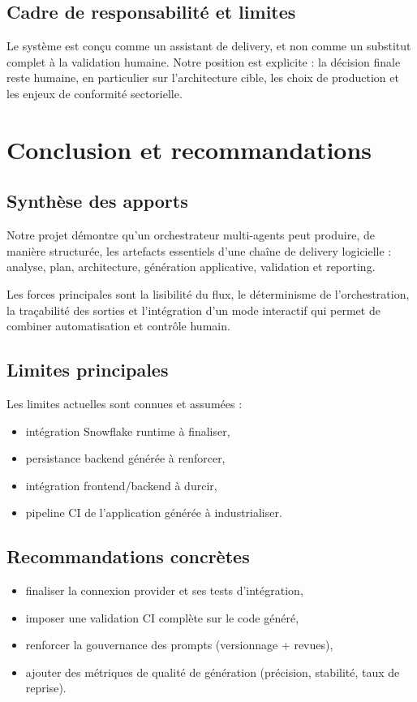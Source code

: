 \documentclass[11pt,a4paper]{article}
\begin{document}
\subsection*{Cadre de responsabilité et limites}
Le système est conçu comme un assistant de delivery, et non comme un substitut complet à la validation humaine. Notre position est explicite : la décision finale reste humaine, en particulier sur l'architecture cible, les choix de production et les enjeux de conformité sectorielle.

\section{Conclusion et recommandations}
\subsection*{Synthèse des apports}
Notre projet démontre qu'un orchestrateur multi-agents peut produire, de manière structurée, les artefacts essentiels d'une chaîne de delivery logicielle : analyse, plan, architecture, génération applicative, validation et reporting.

Les forces principales sont la lisibilité du flux, le déterminisme de l'orchestration, la traçabilité des sorties et l'intégration d'un mode interactif qui permet de combiner automatisation et contrôle humain.

\subsection*{Limites principales}
Les limites actuelles sont connues et assumées :
\begin{itemize}
  \item intégration Snowflake runtime à finaliser,
  \item persistance backend générée à renforcer,
  \item intégration frontend/backend à durcir,
  \item pipeline CI de l'application générée à industrialiser.
\end{itemize}

\subsection*{Recommandations concrètes}
\begin{itemize}
  \item finaliser la connexion provider et ses tests d'intégration,
  \item imposer une validation CI complète sur le code généré,
  \item renforcer la gouvernance des prompts (versionnage + revues),
  \item ajouter des métriques de qualité de génération (précision, stabilité, taux de reprise).
\end{itemize}
\end{document}
